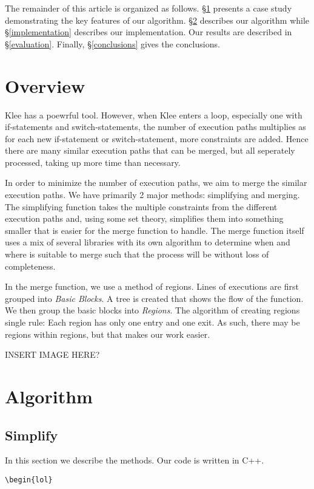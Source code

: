 \documentclass[12pt,twocolumn,a4paper]{article}
\begin{document}
The remainder of this article is organized as follows. \S\ref{overview} presents a case study demonstrating the key features of our algorithm. \S\ref{algorithm} describes our algorithm while \S\ref{implementation} describes our implementation. Our results are described in \S\ref{evaluation}. Finally, \S\ref{conclusions} gives the conclusions.

\section{Overview}\label{overview}
Klee has a poewrful tool. However, when Klee enters a loop, especially one with if-statements and switch-statements, the number of execution paths multiplies as for each new if-statement or switch-statement, more constraints are added. Hence there are many similar execution paths that can be merged, but all seperately processed, taking up more time than necessary.

In order to minimize the number of execution paths, we aim to merge the similar execution paths. We have primarily 2 major methods: simplifying and merging. The simplifying function takes the multiple constraints from the different execution paths and, using some set theory, simplifies them into something smaller that is easier for the merge function to handle. The merge function itself uses a mix of several libraries with its own algorithm to determine when and where is suitable to merge such that the process will be without loss of completeness.

In the merge function, we use a method of regions. Lines of executions are first grouped into \emph{Basic Blocks}. A tree is created that shows the flow of the function. We then group the basic blocks into \emph{Regions}. The algorithm of creating regions single rule: Each region has only one entry and one exit. As such, there may be regions within regions, but that makes our work easier. 

INSERT IMAGE HERE?

\section{Algorithm}\label{algorithm}
\subsection{Simplify}
In this section we describe the methods.
Our code is written in C++.

\begin{verbatim}
\begin{lol}
\end{verbatim}
\end{document}
